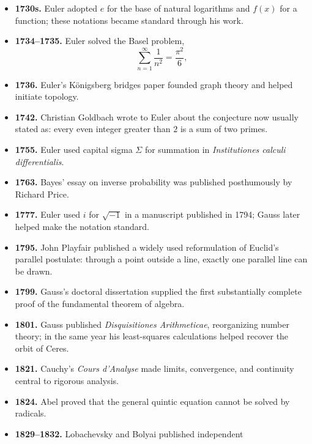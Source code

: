 \begin{itemize}
              called Taylor's theorem.
        \item \textbf{1730s.} Euler adopted $e$ for the base of natural
              logarithms and $f(x)$ for a function; these notations became
              standard through his work.
        \item \textbf{1734--1735.} Euler solved the Basel problem,
              \[
                  \sum_{n=1}^{\infty}\frac{1}{n^2}=\frac{\pi^2}{6},
              \]
        \item \textbf{1736.} Euler's Königsberg bridges paper founded graph
              theory and helped initiate topology.
        \item \textbf{1742.} Christian Goldbach wrote to Euler about the
              conjecture now usually stated as: every even integer greater than
              $2$ is a sum of two primes.
        \item \textbf{1755.} Euler used capital sigma $\Sigma$ for summation in
              \textit{Institutiones calculi differentialis}.
        \item \textbf{1763.} Bayes' essay on inverse probability was published
              posthumously by Richard Price.
        \item \textbf{1777.} Euler used $i$ for $\sqrt{-1}$ in a manuscript
              published in 1794; Gauss later helped make the notation standard.
        \item \textbf{1795.} John Playfair published a widely used reformulation
              of Euclid's parallel postulate: through a point outside a line,
              exactly one parallel line can be drawn.
        \item \textbf{1799.} Gauss's doctoral dissertation supplied the first
              substantially complete proof of the fundamental theorem of
              algebra.
        \item \textbf{1801.} Gauss published
              \textit{Disquisitiones Arithmeticae}, reorganizing number theory;
              in the same year his least-squares calculations helped recover
              the orbit of Ceres.
        \item \textbf{1821.} Cauchy's \textit{Cours d'Analyse} made limits,
              convergence, and continuity central to rigorous analysis.
        \item \textbf{1824.} Abel proved that the general quintic equation
              cannot be solved by radicals.
        \item \textbf{1829--1832.} Lobachevsky and Bolyai published independent

\end{itemize}
